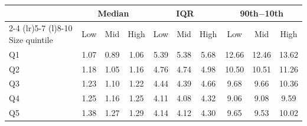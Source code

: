 \begin{tabular}{@{}lccccccccc@{}}
\toprule
 & \multicolumn{3}{c}{Median} & \multicolumn{3}{c}{IQR} & \multicolumn{3}{c}{90th$-$10th} \\
\cmidrule(lr){2-4} \cmidrule(lr){5-7} \cmidrule(l){8-10}
Size quintile & Low & Mid & High & Low & Mid & High & Low & Mid & High \\
\midrule
Q1 & 1.07 & 0.89 & 1.06 & 5.39 & 5.38 & 5.68 & 12.66 & 12.46 & 13.62 \\
Q2 & 1.18 & 1.05 & 1.16 & 4.76 & 4.74 & 4.98 & 10.50 & 10.51 & 11.26 \\
Q3 & 1.23 & 1.10 & 1.22 & 4.44 & 4.39 & 4.66 & 9.68 & 9.66 & 10.36 \\
Q4 & 1.25 & 1.16 & 1.25 & 4.11 & 4.08 & 4.32 & 9.06 & 9.08 & 9.59 \\
Q5 & 1.38 & 1.27 & 1.29 & 4.14 & 4.12 & 4.30 & 9.65 & 9.53 & 10.02 \\
\bottomrule
\end{tabular}
